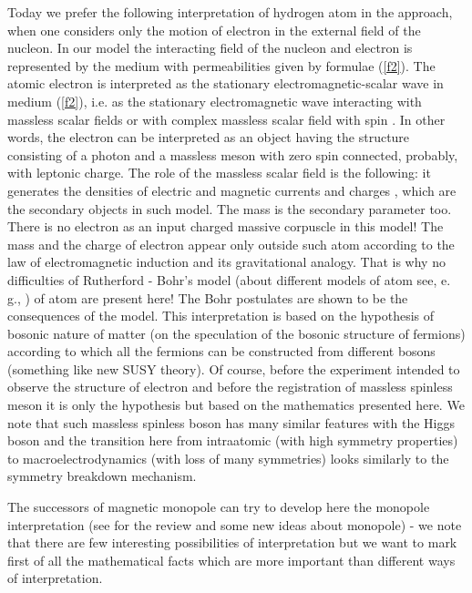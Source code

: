 \documentclass[a4paper,12pt]{article}
\begin{document}
Today we prefer the following interpretation of hydrogen atom in the
approach, when one considers only the motion of electron in the external
field of the nucleon. In our model the interacting field of the nucleon and
electron is represented by the medium with permeabilities \myHighlight{$\epsilon ,\mu $}\coordHE{}
given by formulae (\ref{f2}). The atomic electron is interpreted as the
stationary electromagnetic-scalar wave \coordHE{} in medium (\ref{f2}), i.e. as the stationary electromagnetic
wave interacting with massless scalar fields \coordHE{} or with complex
massless scalar field \coordHE{} with spin \coordHE{}. In other
words, the electron can be interpreted as an object having the structure
consisting of a photon and a massless meson with zero spin connected,
probably, with leptonic charge. The role of the massless scalar field is the
following: it generates the densities of electric and magnetic currents and
charges \coordHE{}, which are the secondary objects in
such model. The mass is the secondary parameter too. There is no electron as
an input charged massive corpuscle in this model! The mass and the charge of
electron appear only outside such atom according to the law of
electromagnetic induction and its gravitational analogy. That is why no
difficulties of Rutherford - Bohr's model (about different models of atom
see, e. g., \cite{LAK}) of atom are present here! The Bohr postulates are
shown to be the consequences of the model. This interpretation is based on
the hypothesis of bosonic nature of matter (on the speculation of the
bosonic structure of fermions) according to which all the fermions can be
constructed from different bosons (something like new SUSY theory). Of
course, before the experiment intended to observe the structure of electron
and before the registration of massless spinless meson it is only the
hypothesis but based on the mathematics presented here. We note that such
massless spinless boson has many similar features with the Higgs boson and
the transition here from intraatomic (with high symmetry properties) to
macroelectrodynamics (with loss of many symmetries) looks similarly to the
symmetry breakdown mechanism.

The successors of magnetic monopole can try to develop here the monopole
interpretation (see \cite{Lochak} for the review and some new ideas about
monopole) - we note that there are few interesting possibilities of
interpretation but we want to mark first of all the mathematical facts which
are more important than different ways of interpretation.
\end{document}

